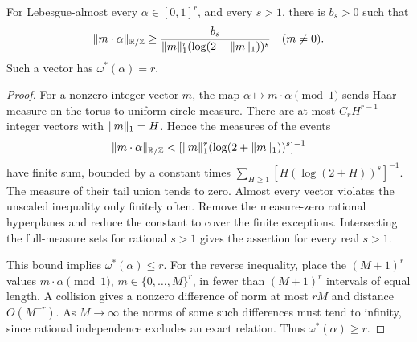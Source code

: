 \begin{lemma}\label{lem:metric-separation}
For Lebesgue-almost every $\alpha\in[0,1]^r$, and every $s>1$, there is $b_s>0$ such that
\begin{equation}\label{eq:log-separation}
 \lVert m\cdot\alpha\rVert_{\mathbb R/\mathbb Z}\ge
       \frac{b_s}{\lVert m\rVert_1^r(\log(2+\lVert m\rVert_1))^s}
                     \quad(m\ne0).
\end{equation}
Such a vector has $\omega^*(\alpha)=r$.
\end{lemma}
\begin{proof}
For a nonzero integer vector $m$, the map $\alpha\mapsto m\cdot\alpha\pmod1$ sends Haar measure on the torus to uniform circle measure. There are at most $C_rH^{r-1}$ integer vectors with $\lVert m\rVert_1=H$. Hence the measures of the events
\[
 \lVert m\cdot\alpha\rVert_{\mathbb R/\mathbb Z}<[\lVert m\rVert_1^r(\log(2+\lVert m\rVert_1))^s]^{-1}
\]
have finite sum, bounded by a constant times
$\sum_{H\ge1}[H(\log(2+H))^s]^{-1}$.
The measure of their tail union tends to zero. Almost every vector violates the unscaled inequality only finitely often. Remove the measure-zero rational hyperplanes and reduce the constant to cover the finite exceptions. Intersecting the full-measure sets for rational $s>1$ gives the assertion for every real $s>1$.

This bound implies $\omega^*(\alpha)\le r$. For the reverse inequality, place the $(M+1)^r$ values $m\cdot\alpha\pmod1$, $m\in\{0,\ldots,M\}^r$, in fewer than $(M+1)^r$ intervals of equal length. A collision gives a nonzero difference of norm at most $rM$ and distance $O(M^{-r})$. As $M\to\infty$ the norms of some such differences must tend to infinity, since rational independence excludes an exact relation. Thus $\omega^*(\alpha)\ge r$.
\end{proof}

